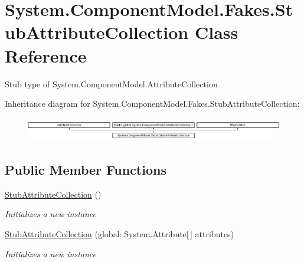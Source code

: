 \hypertarget{class_system_1_1_component_model_1_1_fakes_1_1_stub_attribute_collection}{\section{System.\-Component\-Model.\-Fakes.\-Stub\-Attribute\-Collection Class Reference}
\label{class_system_1_1_component_model_1_1_fakes_1_1_stub_attribute_collection}
}


Stub type of System.\-Component\-Model.\-Attribute\-Collection 


Inheritance diagram for System.\-Component\-Model.\-Fakes.\-Stub\-Attribute\-Collection\-:\begin{figure}[H]
\begin{center}
\leavevmode
\includegraphics[height=1.039926cm]{class_system_1_1_component_model_1_1_fakes_1_1_stub_attribute_collection}
\end{center}
\end{figure}
\subsection*{Public Member Functions}
\begin{DoxyCompactItemize}
\item 
\hyperlink{class_system_1_1_component_model_1_1_fakes_1_1_stub_attribute_collection_a49ebcee5a248b5f32676dde11fe7c3fa}{Stub\-Attribute\-Collection} ()
\begin{DoxyCompactList}\small\item\em Initializes a new instance\end{DoxyCompactList}\item 
\hyperlink{class_system_1_1_component_model_1_1_fakes_1_1_stub_attribute_collection_ad73aa7015c1a7220db6b8c504bc99b7a}{Stub\-Attribute\-Collection} (global\-::\-System.\-Attribute\mbox{[}$\,$\mbox{]} attributes)
\begin{DoxyCompactList}\small\item\em Initializes a new instance\end{DoxyCompactList}\end{DoxyCompactItemize}

